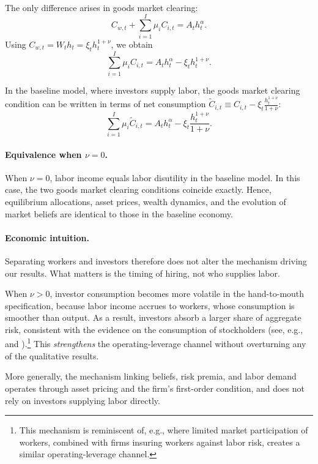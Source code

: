 {The only difference arises in goods market clearing:
\[
C_{w,t} + \sum_{i=1}^I \mu_i C_{i,t}
=
A_t h_t^{\alpha}.
\]
Using $C_{w,t} = W_t h_t = \xi_t h_t^{1+\nu}$,
we obtain
\[
\sum_{i=1}^I \mu_i C_{i,t}
=
A_t h_t^{\alpha} - \xi_t h_t^{1+\nu}.
\]

In the baseline model, where investors supply labor,
the goods market clearing condition can be written in terms of net consumption
$\tilde C_{i,t} \equiv C_{i,t} - \xi_t \frac{h_t^{1+\nu}}{1+\nu}$:
\[
\sum_{i=1}^I \mu_i \tilde C_{i,t}
=
A_t h_t^{\alpha}
-
\xi_t \frac{h_t^{1+\nu}}{1+\nu}.
\]

\paragraph{Equivalence when $\nu = 0$.}

When $\nu = 0$, labor income equals labor disutility in the baseline model.
In this case, the two goods market clearing conditions coincide exactly.
Hence, equilibrium allocations, asset prices, wealth dynamics,
and the evolution of market beliefs are identical to those in the baseline economy.

\paragraph{Economic intuition.}

Separating workers and investors therefore does not alter the mechanism
driving our results.
What matters is the timing of hiring, not who supplies labor.

When $\nu > 0$, investor consumption becomes more volatile in the
hand-to-mouth specification, because labor income accrues to workers,
whose consumption is smoother than output.
As a result, investors absorb a larger share of aggregate risk, consistent with the evidence on the consumption of stockholders (see, e.g., \citealt{mankiw1991consumption} and \citealt{parker2001consumption}).\footnote{This mechanism is reminiscent of, e.g., \citet{danthine2002labour} where limited market participation of workers, combined with firms insuring workers against labor risk, creates a similar operating-leverage channel.}
This \textit{strengthens} the operating-leverage channel without overturning
any of the qualitative results.

More generally, the mechanism linking beliefs, risk premia,
and labor demand operates through asset pricing and the firm's first-order condition,
and does not rely on investors supplying labor directly.}


